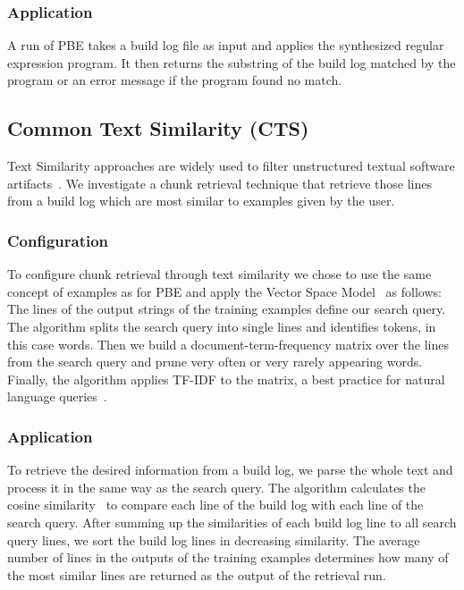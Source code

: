 \subsubsection{Application}
A run of PBE takes a build log file as input and applies the
synthesized regular expression program.
It then returns the substring
of the build log matched by the program or an error message if the
program found no match.



\subsection{Common Text Similarity (CTS)}
Text Similarity approaches are widely used to filter unstructured
textual software artifacts~\cite{runeson2007detection,
marcus2005recovery,antoniol2002recovering,mccarey2006recommending}.
We investigate a chunk retrieval technique that
retrieve those lines from a build log which are most
similar to examples given by the user.

\subsubsection{Configuration}
To configure chunk retrieval through text similarity we chose to use
the same concept of examples as for PBE
and apply the Vector Space Model~\cite{schutze2008introduction}
as follows:
The lines of the output strings of the training examples define our
search query.
The algorithm splits the search query into single lines and
identifies tokens, in this case words.
Then we build a
document-term-frequency matrix over the lines from the search query
and prune very often or very rarely appearing words.
Finally, the
algorithm applies TF-IDF to the matrix, a best practice for natural
language queries~\cite{lee1997document}.

\subsubsection{Application}
To retrieve the desired information from a build log, we parse the
whole text and process it in the same way as the search query.
The algorithm calculates the cosine
similarity~\cite{korenius2007principal} to compare each line of the
build log with each line of the search query.
After summing up the
similarities of each build log line to all search query lines, we sort
the build log lines in decreasing similarity.
The average number of
lines in the outputs of the training examples determines how many of
the most similar lines are returned as the output of the retrieval
run.

